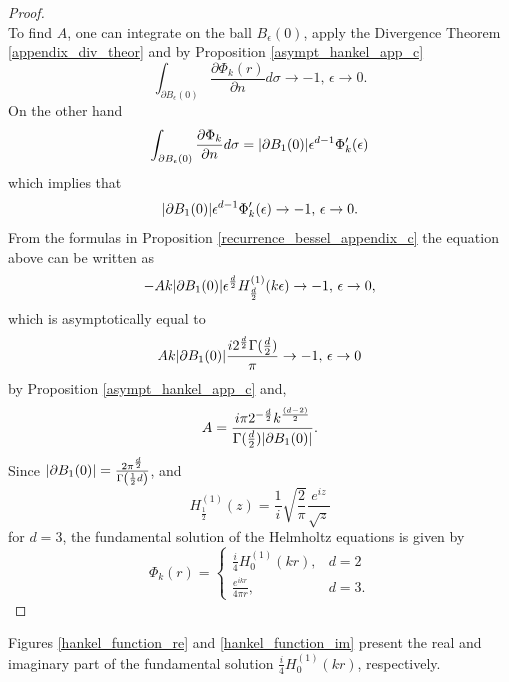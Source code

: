 \begin{proof}
\[    \]
    To find \(A\), one can integrate on the ball \(B_\epsilon(0)\), apply the Divergence Theorem \ref{appendix_div_theor} and by Proposition \ref{asympt_hankel_app_c}
    \[
        \int_{\partial B_\epsilon(0)} \frac{\partial \Phi_k(r)}{\partial n}d \sigma \rightarrow -1, \, \epsilon \rightarrow 0.
    \] 
    On the other hand
    \[
        \int_{\partial B_\epsilon(0)} \frac{\partial \Phi_k}{\partial n}d \sigma = \abs{\partial B_1(0)} \epsilon^{d-1}\Phi_k'(\epsilon)
    \]
    which implies that
    \[
        \abs{\partial B_1(0)} \epsilon^{d-1}\Phi_k'(\epsilon) \rightarrow -1, \, \epsilon \rightarrow 0.
    \]
    From the formulas in Proposition \ref{recurrence_bessel_appendix_c} the equation above can be written as
    \[
        -A k  \abs{\partial B_1(0)} \epsilon^{\frac{d}{2}}H^{(1)}_{\frac{d}{2}}(k \epsilon) \rightarrow -1, \, \epsilon \rightarrow 0,
    \]
    which is asymptotically equal to
    \[
        A k \abs{\partial B_1(0)} \frac{i 2^{\frac{d}{2}} \Gamma(\frac{d}{2})}{\pi}  \rightarrow -1, \, \epsilon \rightarrow 0
    \]
    by Proposition \ref{asympt_hankel_app_c} and,
    \[
        A = \frac{i \pi 2^{-\frac{d}{2}}k^{\frac{(d-2)}{2}}}{\Gamma(\frac{d}{2})\abs{\partial B_1(0)}}.
    \]
    Since \(\abs{\partial B_1(0)} = \frac{2 \pi^{\frac{d}{2}}}{\Gamma\left(\frac{1}{2}d\right)}\), 
    and 
    \[
        H^{(1)}_{\frac{1}{2}}(z) = \frac{1}{i}\sqrt{\frac{2}{\pi}}\frac{e^{i z}}{\sqrt{z}}
    \]
    for \(d=3\), the fundamental solution of the Helmholtz equations is given by
    \[
        \Phi_k(r) = \begin{cases}
            \frac{i}{4} H_0^{(1)}(k r), & d=2\\
            \frac{e^{i k r}}{4 \pi r}, & d = 3.
        \end{cases}    
    \]
\end{proof}

Figures \ref{hankel_function_re} and \ref{hankel_function_im} present the real and imaginary part of the fundamental solution \(\frac{i}{4} H_0^{(1)}(k r)\), respectively.

